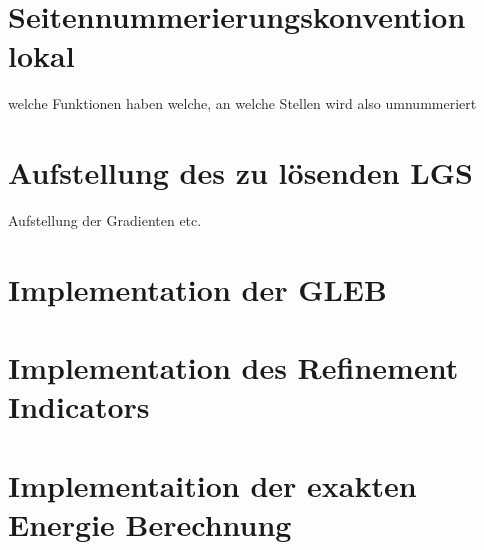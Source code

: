 \section{Seitennummerierungskonvention lokal}
welche Funktionen haben welche, an 
welche Stellen wird also umnummeriert

\section{Aufstellung des zu lösenden LGS}
Aufstellung der Gradienten etc.
 
\section{Implementation der GLEB}

\section{Implementation des Refinement Indicators}

\section{Implementaition der exakten Energie Berechnung}

